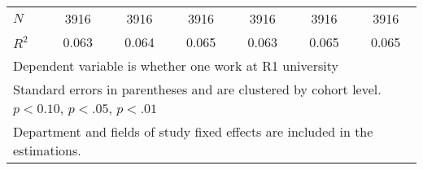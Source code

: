 \begin{table}[ht]
{\begin{tabular}{l*{6}{c}}
\hline
\(N\)       &        3916         &        3916         &        3916         &        3916         &        3916         &        3916         \\
\(R^{2}\)   &       0.063         &       0.064         &       0.065         &       0.063         &       0.065         &       0.065         \\
\hline\hline
\multicolumn{7}{l}{\footnotesize Dependent variable is whether one work at R1 university}\\
\multicolumn{7}{l}{\footnotesize Standard errors in parentheses and are clustered by cohort level. \sym{*} \(p<0.10\), \sym{**} \(p<.05\), \sym{***} \(p<.01\)}\\
\multicolumn{7}{l}{\footnotesize Department and fields of study fixed effects are included in the estimations.}\\
\end{tabular}%
}
\end{table}